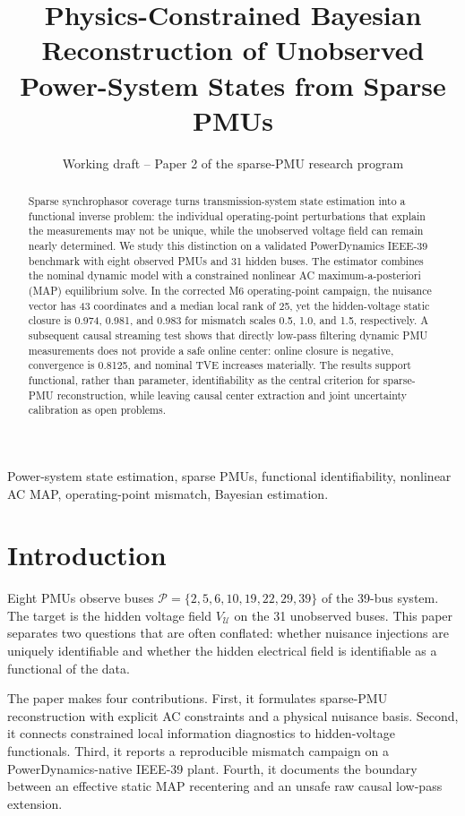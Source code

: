 \documentclass[journal]{IEEEtran}
\title{Physics-Constrained Bayesian Reconstruction of Unobserved Power-System States from Sparse PMUs}
\author{Working draft -- Paper 2 of the sparse-PMU research program}
\begin{document}
\maketitle

\begin{abstract}
Sparse synchrophasor coverage turns transmission-system state estimation into
a functional inverse problem: the individual operating-point perturbations
that explain the measurements may not be unique, while the unobserved voltage
field can remain nearly determined. We study this distinction on a validated
PowerDynamics IEEE-39 benchmark with eight observed PMUs and 31 hidden buses.
The estimator combines the nominal dynamic model with a constrained nonlinear
AC maximum-a-posteriori (MAP) equilibrium solve. In the corrected M6
operating-point campaign, the nuisance vector has 43 coordinates and a median
local rank of 25, yet the hidden-voltage static closure is 0.974, 0.981, and
0.983 for mismatch scales 0.5, 1.0, and 1.5, respectively. A subsequent causal
streaming test shows that directly low-pass filtering dynamic PMU measurements
does not provide a safe online center: online closure is negative, convergence
is 0.8125, and nominal TVE increases materially. The results support
functional, rather than parameter, identifiability as the central criterion
for sparse-PMU reconstruction, while leaving causal center extraction and
joint uncertainty calibration as open problems.
\end{abstract}

\begin{IEEEkeywords}
Power-system state estimation, sparse PMUs, functional identifiability,
nonlinear AC MAP, operating-point mismatch, Bayesian estimation.
\end{IEEEkeywords}

\section{Introduction}
Eight PMUs observe buses $\mathcal P=\{2,5,6,10,19,22,29,39\}$ of the
39-bus system. The target is the hidden voltage field $V_{\mathcal U}$ on the
31 unobserved buses. This paper separates two questions that are often
conflated: whether nuisance injections are uniquely identifiable and whether
the hidden electrical field is identifiable as a functional of the data.

The paper makes four contributions. First, it formulates sparse-PMU
reconstruction with explicit AC constraints and a physical nuisance basis.
Second, it connects constrained local information diagnostics to hidden-voltage
functionals. Third, it reports a reproducible mismatch campaign on a
PowerDynamics-native IEEE-39 plant. Fourth, it documents the boundary between
an effective static MAP recentering and an unsafe raw causal low-pass extension.
\end{document}
